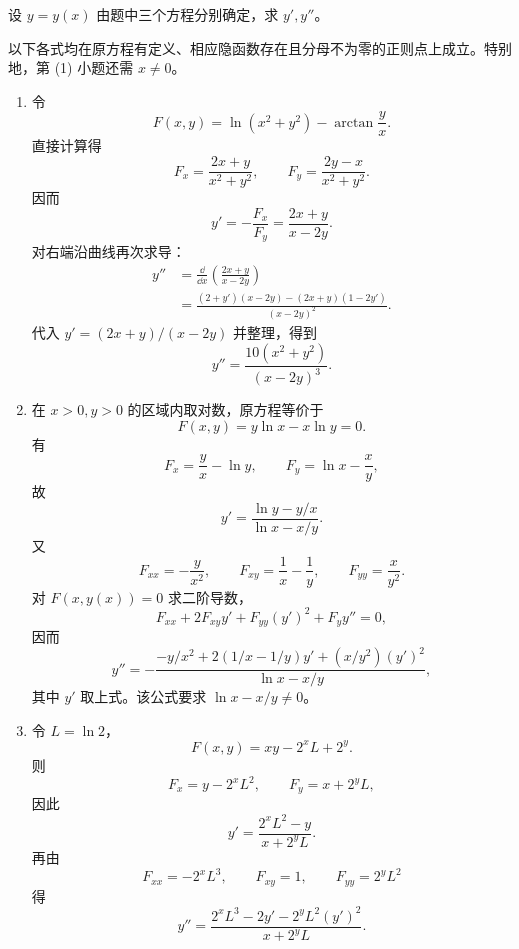 \begin{xexercise}[20.1.4 练习题 1]
设 $y=y(x)$ 由题中三个方程分别确定，求 $y',y''$。
\end{xexercise}
\begin{xsolution}
以下各式均在原方程有定义、相应隐函数存在且分母不为零的正则点上成立。特别地，第 (1) 小题还需 $x\ne0$。

\begin{enumerate}[label=(\arabic*)]
  \item 令
  \[
    F(x,y)=\ln(x^2+y^2)-\arctan\frac yx.
  \]
  直接计算得
  \[
    F_x=\frac{2x+y}{x^2+y^2},\qquad
    F_y=\frac{2y-x}{x^2+y^2}.
  \]
  因而
  \[
    y'=-\frac{F_x}{F_y}
    =\frac{2x+y}{x-2y}.
  \]
  对右端沿曲线再次求导：
  \begin{align*}
    y''
    &=\frac{\dd}{\dd x}\left(\frac{2x+y}{x-2y}\right)\\
    &=\frac{(2+y')(x-2y)-(2x+y)(1-2y')}{(x-2y)^2}.
  \end{align*}
  代入 $y'=(2x+y)/(x-2y)$ 并整理，得到
  \[
    \boxed{\displaystyle
      y''=\frac{10(x^2+y^2)}{(x-2y)^3}}.
  \]

  \item 在 $x>0,y>0$ 的区域内取对数，原方程等价于
  \[
    F(x,y)=y\ln x-x\ln y=0.
  \]
  有
  \[
    F_x=\frac yx-\ln y,
    \qquad
    F_y=\ln x-\frac xy,
  \]
  故
  \[
    \boxed{\displaystyle
      y'=\frac{\ln y-y/x}{\ln x-x/y}}.
  \]
  又
  \[
    F_{xx}=-\frac{y}{x^2},\qquad
    F_{xy}=\frac1x-\frac1y,
    \qquad
    F_{yy}=\frac{x}{y^2}.
  \]
  对 $F(x,y(x))=0$ 求二阶导数，
  \[
    F_{xx}+2F_{xy}y'+F_{yy}(y')^2+F_yy''=0,
  \]
  因而
  \[
    \boxed{\displaystyle
      y''=
      -\frac{-y/x^2+2(1/x-1/y)y'+(x/y^2)(y')^2}
      {\ln x-x/y}},
  \]
  其中 $y'$ 取上式。该公式要求 $\ln x-x/y\ne0$。

  \item 令 $L=\ln2$，
  \[
    F(x,y)=xy-2^xL+2^y.
  \]
  则
  \[
    F_x=y-2^xL^2,
    \qquad
    F_y=x+2^yL,
  \]
  因此
  \[
    \boxed{\displaystyle
      y'=\frac{2^xL^2-y}{x+2^yL}}.
  \]
  再由
  \[
    F_{xx}=-2^xL^3,\qquad F_{xy}=1,\qquad F_{yy}=2^yL^2
  \]
  得
  \[
    \boxed{\displaystyle
      y''=\frac{2^xL^3-2y'-2^yL^2(y')^2}{x+2^yL}}.
  \]
\end{enumerate}
\end{xsolution}


